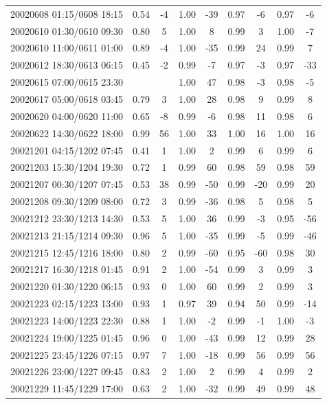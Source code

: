 \documentclass[draft]{agujournal2019}
\begin{document}
\begin{center}
\begin{longtable}{c||cc|cc|cc|cc}
20020608 01:15/0608 18:15 & 0.54 & -4 & 1.00 & -39 & 0.97 & -6 & 0.97 & -6 \\
20020610 01:30/0610 09:30 & 0.80 & 5 & 1.00 & 8 & 0.99 & 3 & 1.00 & -7 \\
20020610 11:00/0611 01:00 & 0.89 & -4 & 1.00 & -35 & 0.99 & 24 & 0.99 & 7 \\
20020612 18:30/0613 06:15 & 0.45 & -2 & 0.99 & -7 & 0.97 & -3 & 0.97 & -33 \\
20020615 07:00/0615 23:30 & & & 1.00 & 47 & 0.98 & -3 & 0.98 & -5 \\
20020617 05:00/0618 03:45 & 0.79 & 3 & 1.00 & 28 & 0.98 & 9 & 0.99 & 8 \\
20020620 04:00/0620 11:00 & 0.65 & -8 & 0.99 & -6 & 0.98 & 11 & 0.98 & 6 \\
20020622 14:30/0622 18:00 & 0.99 & 56 & 1.00 & 33 & 1.00 & 16 & 1.00 & 16 \\
20021201 04:15/1202 07:45 & 0.41 & 1 & 1.00 & 2 & 0.99 & 6 & 0.99 & 6 \\
20021203 15:30/1204 19:30 & 0.72 & 1 & 0.99 & 60 & 0.98 & 59 & 0.98 & 59 \\
20021207 00:30/1207 07:45 & 0.53 & 38 & 0.99 & -50 & 0.99 & -20 & 0.99 & 20 \\
20021208 09:30/1209 08:00 & 0.72 & 3 & 0.99 & -36 & 0.98 & 5 & 0.98 & 5 \\
20021212 23:30/1213 14:30 & 0.53 & 5 & 1.00 & 36 & 0.99 & -3 & 0.95 & -56 \\
20021213 21:15/1214 09:30 & 0.96 & 5 & 1.00 & -35 & 0.99 & -5 & 0.99 & -46 \\
20021215 12:45/1216 18:00 & 0.80 & 2 & 0.99 & -60 & 0.95 & -60 & 0.98 & 30 \\
20021217 16:30/1218 01:45 & 0.91 & 2 & 1.00 & -54 & 0.99 & 3 & 0.99 & 3 \\
20021220 01:30/1220 06:15 & 0.93 & 0 & 1.00 & 60 & 0.99 & 2 & 0.99 & 3 \\
20021223 02:15/1223 13:00 & 0.93 & 1 & 0.97 & 39 & 0.94 & 50 & 0.99 & -14 \\
20021223 14:00/1223 22:30 & 0.88 & 1 & 1.00 & -2 & 0.99 & -1 & 1.00 & -3 \\
20021224 19:00/1225 01:45 & 0.96 & 0 & 1.00 & -43 & 0.99 & 12 & 0.99 & 28 \\
20021225 23:45/1226 07:15 & 0.97 & 7 & 1.00 & -18 & 0.99 & 56 & 0.99 & 56 \\
20021226 23:00/1227 09:45 & 0.83 & 2 & 1.00 & 2 & 0.99 & 4 & 0.99 & 2 \\
20021229 11:45/1229 17:00 & 0.63 & 2 & 1.00 & -32 & 0.99 & 49 & 0.99 & 48 \\

\end{longtable}
\end{center}
\end{document}
